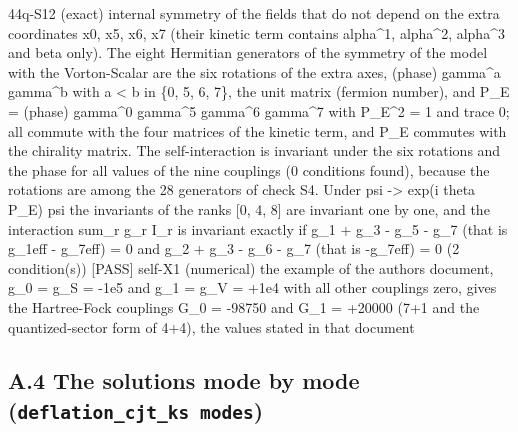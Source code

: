 \documentclass[
  10pt,
]{article}
\newenvironment{Shaded}{}{}
\newcommand{\NormalTok}[1]{#1}
\begin{document}
\begin{Shaded}
\begin{Highlighting}[]
\NormalTok{[PASS] 44q{-}S12  (exact) internal symmetry of the fields that do not depend on the extra coordinates x0, x5, x6, x7 (their kinetic term contains alpha\^{}1, alpha\^{}2, alpha\^{}3 and beta only). The eight Hermitian generators of the symmetry of the model with the Vorton{-}Scalar are the six rotations of the extra axes, (phase) gamma\^{}a gamma\^{}b with a \textless{} b in \{0, 5, 6, 7\}, the unit matrix (fermion number), and P\_E = (phase) gamma\^{}0 gamma\^{}5 gamma\^{}6 gamma\^{}7 with P\_E\^{}2 = 1 and trace 0; all commute with the four matrices of the kinetic term, and P\_E commutes with the chirality matrix. The self{-}interaction is invariant under the six rotations and the phase for all values of the nine couplings (0 conditions found), because the rotations are among the 28 generators of check S4. Under psi {-}\textgreater{} exp(i theta P\_E) psi the invariants of the ranks [0, 4, 8] are invariant one by one, and the interaction sum\_r g\_r I\_r is invariant exactly if g\_1 + g\_3 {-} g\_5 {-} g\_7 (that is g\_1eff {-} g\_7eff) = 0 and g\_2 + g\_3 {-} g\_6 {-} g\_7 (that is {-}g\_7eff) = 0 (2 condition(s))}
\NormalTok{[PASS] self{-}X1  (numerical) the example of the author\textquotesingle{}s document, g\_0 = g\_S = {-}1e5 and g\_1 = g\_V = +1e4 with all other couplings zero, gives the Hartree{-}Fock couplings G\_0 = {-}98750 and G\_1 = +20000 (7+1 and the quantized{-}sector form of 4+4), the values stated in that document}
\end{Highlighting}
\end{Shaded}

\hypertarget{a.4-the-solutions-mode-by-mode-deflation_cjt_ks-modes}{%
\subsection{\texorpdfstring{A.4 The solutions mode by mode
(\texttt{deflation\_cjt\_ks\ modes})}{A.4 The solutions mode by mode (deflation\_cjt\_ks modes)}}\label{a.4-the-solutions-mode-by-mode-deflation_cjt_ks-modes}}
\end{document}

